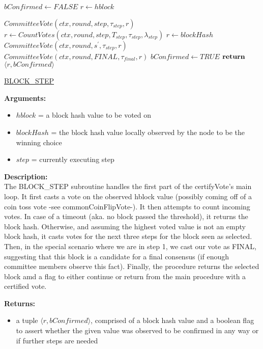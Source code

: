 \documentclass[10pt,a4paper]{article}
\begin{document}
\begin{algorithm}
    \begin{algorithmic}[H]
        \State $bConfirmed \gets FALSE$
        \State $r \gets hblock$

        \State $CommitteeVote(ctx, round, step, \tau_{step}, r)$
        \State $r \gets CountVotes(ctx,round,step,T_{step},\tau_{step},\lambda_{step})$
            \State $r \gets blockHash$
                \State $CommitteeVote(ctx, round, s^\prime, \tau_{step}, r)$
            \EndFor
                \State $CommitteeVote(ctx, round, FINAL, \tau_{final}, r)$
            \EndIf
            \State $bConfirmed \gets TRUE$
        \EndIf
        $\Return$ $ \langle r, bConfirmed \rangle$
    \EndFunction
    \end{algorithmic}
    \caption{\underline{BLOCK\_STEP}}
\end{algorithm}

\noindent \textbf{Arguments:}
\begin{itemize}
    \item $hblock$ = a block hash value to be voted on
    \item $blockHash$ = the block hash value locally observed by the node to be the winning choice
    \item $step$ = currently executing step
  \end{itemize}

\noindent \textbf{Description:}\\
The BLOCK\_STEP subroutine handles the first part of the certifyVote's main loop.
It first casts a vote on the observed hblock value (possibly coming off of a coin toss vote -see commonCoinFlipVote-).
It then attempts to count incoming votes. In case of a timeout (aka. no block passed the threshold), it returns the block hash.
Otherwise, and assuming the highest voted value is not an empty block hash, it casts votes for the next three steps for the block seen as selected.
Then, in the special scenario where we are in step 1, we cast our vote as FINAL, suggesting that this block is a candidate for a final consensus (if enough committee members observe this fact).
Finally, the procedure returns the selected block amd a flag to either continue or return from the main procedure with a certified vote.

\noindent \textbf{Returns:}
\begin{itemize}
    \item a tuple $\langle r, bConfirmed \rangle$, comprised of a block hash value and a boolean flag to assert whether the given value was
    observed to be confirmed in any way or if further steps are needed
  \end{itemize}
\end{document}
